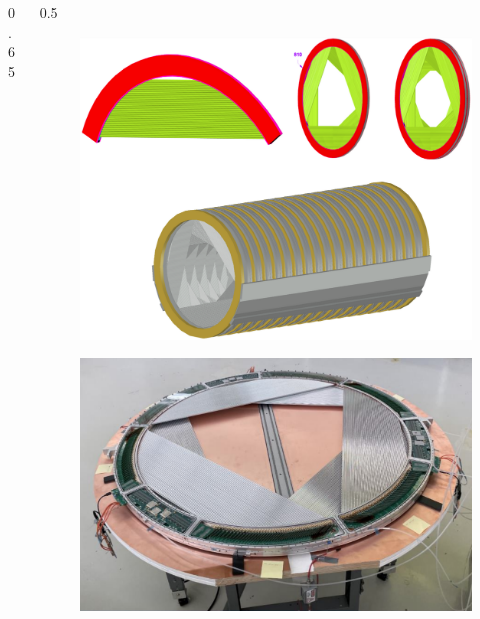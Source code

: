 \documentclass{beamer}
\begin{document}
\begin{frame}
\begin{columns}
\begin{column}{0.65 \framewidth}
    \end{column}
    \begin{column}{0.5 \framewidth}
    \vspace{-10mm}
      \begin{figure}[h!]
          \centering
\includegraphics[width=0.8\columnwidth]{figures/png/Screenshot_20240306_222803.png}
          \label{fig:enter-label} 
      \end{figure}
     \begin{figure}[h!]
          \centering
            \includegraphics[width=0.8\columnwidth]{figures/png/Screenshot_20240706_163056.png}
          \label{fig:enter-label} 
      \end{figure}
    \end{column}
    \end{columns}
    \end{frame}
\end{document}
